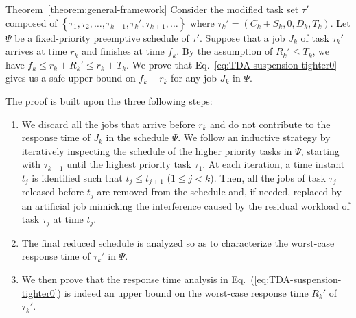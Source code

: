 \begin{appProof}{Theorem~\ref{theorem:general-framework}}
Consider the modified task set $\tau'$ composed of $\left\{\tau_1, \tau_2, \ldots, \tau_{k-1}, \tau_k', \tau_{k+1}, \ldots \right\}$ where $\tau_k' = (C_k + S_k, 0, D_k, T_k)$. Let $\Psi$ be a fixed-priority preemptive schedule of $\tau'$.
Suppose that a job $J_{k}$ of task $\tau_k'$ arrives at time $r_k$ and finishes at time $f_k$. 
By the assumption of $R_k' \leq T_k$, we have $f_k \leq r_k+R_k' \leq r_k+T_k$.
We prove that Eq.~\eqref{eq:TDA-suspension-tighter0} gives us a safe upper bound on $f_k-r_k$ for any job $J_k$ in $\Psi$.


The proof is built upon the three following steps:
\begin{enumerate}
\item We discard all the jobs that arrive before $r_k$ and do not contribute to the response time of $J_k$ in the schedule $\Psi$. We follow an inductive strategy by iteratively inspecting the schedule of the higher priority tasks in $\Psi$, starting with $\tau_{k-1}$ until the highest priority task $\tau_1$. At each iteration, a time instant $t_j$ is identified such that $t_j \leq t_{j+1}$ ($1 \leq j < k$). Then, all the jobs of task $\tau_j$ released before $t_j$ are removed from the schedule and, if needed, replaced by an artificial job mimicking the interference caused by the residual workload of task $\tau_j$ at time $t_j$. %
\item The final reduced schedule is analyzed so as to characterize the
  worst-case response time of $\tau_k'$ in $\Psi$. %
\item We then prove that the response time analysis in Eq.~(\ref{eq:TDA-suspension-tighter0}) is indeed an upper bound on the worst-case response time $R_k'$ of $\tau_k'$.
\end{enumerate}

  

\end{appProof}
